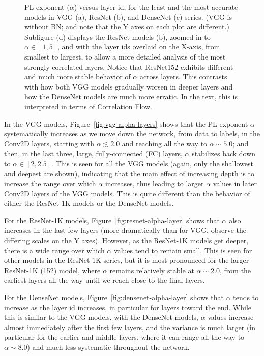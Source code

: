\begin{figure}[t]
{        \label{fig:resnet_alpha_overlaid_depth}
    }
    \caption{PL exponent ($\alpha$) versus layer id, for the least and the most accurate models in VGG (a), ResNet (b), and DenseNet (c) series. 
             (VGG is without BN; and note that the Y axes on each plot are different.)  
             Subfigure (d) displays the ResNet models (b), zoomed in to $\alpha\in[1,5]$, and with the layer ids overlaid on the X-axis, from smallest to largest, to
             allow a more detailed analysis of the most strongly correlated layers.
             Notice that ResNet152 exhibits different and much more stable behavior of $\alpha$ across layers.
             This contrasts with how both VGG models gradually worsen in deeper layers and how the DenseNet models are much more erratic.  
             In the text, this is interpreted in terms of Correlation Flow.
            }
    \label{fig:3models-alpha-layers}
\end{figure}

In the VGG models, Figure~\ref{fig:vgg-alpha-layers} shows that the PL exponent $\alpha$ systematically increases as we move down the network, from data to labels, in the Conv2D layers, starting with $\alpha\lesssim 2.0$ and reaching all the way to $\alpha\sim 5.0$; and then, in the last three, large, fully-connected (FC) layers, $\alpha$ stabilizes back down to $\alpha\in[2,2.5]$.
This is seen for all the VGG models (again, only the shallowest and deepest are shown), indicating that the main effect of increasing depth is to increase the range over which $\alpha$ increases, thus leading to larger $\alpha$ values in later Conv2D layers of the VGG models.
This is quite different than the behavior of either the ResNet-1K models or the DenseNet models.

For the ResNet-1K models, Figure~\ref{fig:resnet-alpha-layer} shows that $\alpha$ also increases in the last few layers (more dramatically than for VGG, observe the differing scales on the Y axes).
However, as the ResNet-1K models get deeper, there is a wide range over which $\alpha$ values tend to remain small.
This is seen for other models in the ResNet-1K series, but it is most pronounced for the larger ResNet-1K (152) model, where $\alpha$ remains relatively stable at $\alpha\sim 2.0$, from the earliest layers all the way until we reach close to the final layers.  

For the DenseNet models, Figure~\ref{fig:densenet-alpha-layer} shows that $\alpha$ tends to increase as the layer id increases, in particular for layers toward the end.
While this is similar to the VGG models, with the DenseNet models, $\alpha$ values increase almost immediately after the first few layers, and the variance is much larger (in particular for the earlier and middle layers, where it can range all the way to $\alpha\sim 8.0$) and much less systematic throughout the network.


